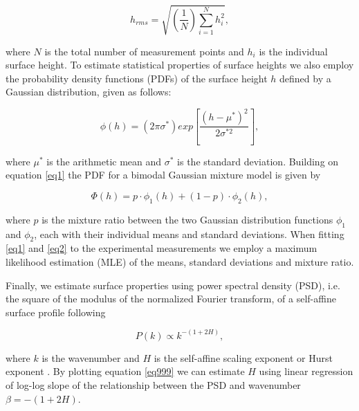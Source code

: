 \documentclass[preprint,1p, 10pt,authoryear]{elsarticle}
\begin{document}
\begin{equation}
h_{rms} = \sqrt{\left(\frac{1}{N} \right) \sum^{N}_{i=1} h_{i}^{2}} ,
\label{eq99}
\end{equation}

\noindent where $N$ is the total number of measurement points and $h_{i}$ is the individual surface height. To estimate statistical properties of surface heights we also employ the probability density functions (PDFs) of the surface height $h$ defined by a Gaussian distribution, given as follows:

\begin{equation}
\phi(h) = \left( 2\pi \sigma^{*} \right) exp\left[ \frac{\left(h - \mu^{*}\right)^{2}} { 2\sigma^{*2}}  \right],
\label{eq1}
\end{equation} 

\noindent where $\mu^{*}$ is the arithmetic mean and $\sigma^{*}$ is the standard deviation. Building on equation \eqref{eq1} the PDF for a bimodal Gaussian mixture model is given by 

\begin{equation}
\Phi(h) = p\cdot \phi_{1}(h)+\left(1-p\right)\cdot \phi_{2}(h),
\label{eq2}
\end{equation}

\noindent where $p$ is the mixture ratio between the two Gaussian distribution functions $\phi_{1}$ and $\phi_{2}$, each with their individual means and standard deviations. When fitting \eqref{eq1} and \eqref{eq2} to the experimental measurements we employ a maximum likelihood estimation (MLE) of the means, standard deviations and mixture ratio. 

Finally, we estimate surface properties using power spectral density (PSD), i.e.  the square of the modulus of the normalized Fourier transform, of a self-affine surface profile following 

\begin{equation}
P(k) \propto k^{-(1+2H)},
\label{eq999}
\end{equation}

\noindent where $k$ is the wavenumber and $H$ is the self-affine scaling exponent or Hurst exponent \citep{Power1991, Schmittbuhl1995, Mai2002, Candela2009}. By plotting equation \eqref{eq999} we can estimate $H$ using linear regression of log-log slope of the relationship between the PSD and wavenumber $\beta =-(1+2H)$.  
\end{document}
